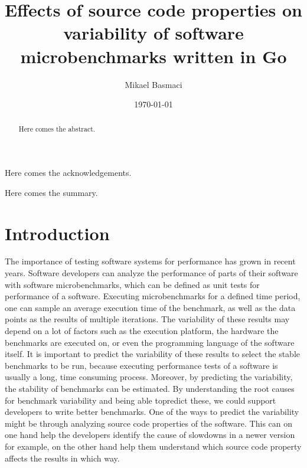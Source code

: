 \documentclass{seal_thesis}
\date{\today}
\title{Effects of source code properties on variability of software microbenchmarks written in Go}
\author{Mikael Basmaci}
\begin{document}
\maketitle

\frontmatter

\begin{acknowledgements}
	Here comes the acknowledgements.
\end{acknowledgements}

\begin{abstract}
	Here comes the abstract.
\end{abstract}

\begin{zusammenfassung}
	Here comes the summary.
\end{zusammenfassung}

\tableofcontents
\listoffigures
\listoftables
\lstlistoflistings

\mainmatter

\chapter{Introduction}
The importance of testing software systems for performance has grown in recent years.
Software developers can analyze the performance of parts of their software with software
microbenchmarks, which can be defined as unit tests for performance of a software.
Executing microbenchmarks for a defined time period, one can sample an average execution
time of the benchmark, as well as the data points as the results of multiple iterations.
The variability of these results may depend on a lot of factors such as the execution platform,
the hardware the benchmarks are executed on, or even the programming language of the
software itself. It is important to predict the variability of these results to select the stable
benchmarks to be run, because executing performance tests of a software is usually a long,
time consuming process. Moreover, by predicting the variability, the stability of benchmarks can
be estimated. By understanding the root causes for benchmark variability and being able topredict these, we could support developers to write better benchmarks. One of the ways to predict the variability might be through analyzing source code properties of the software. This
can on one hand help the developers identify the cause of slowdowns in a newer version for
example, on the other hand help them understand which source code property affects the
results in which way.
\end{document}
